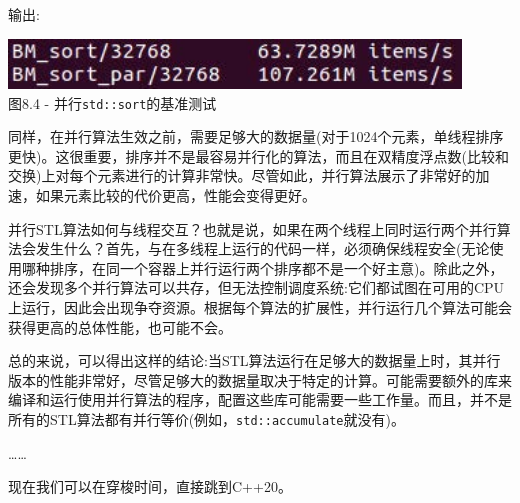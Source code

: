 输出:

\begin{center}
\includegraphics[width=0.9\textwidth]{content/2/chapter8/images/4.jpg}\\
图8.4 - 并行\texttt{std::sort}的基准测试
\end{center}

同样，在并行算法生效之前，需要足够大的数据量(对于1024个元素，单线程排序更快)。这很重要，排序并不是最容易并行化的算法，而且在双精度浮点数(比较和交换)上对每个元素进行的计算非常快。尽管如此，并行算法展示了非常好的加速，如果元素比较的代价更高，性能会变得更好。 

并行STL算法如何与线程交互？也就是说，如果在两个线程上同时运行两个并行算法会发生什么？首先，与在多线程上运行的代码一样，必须确保线程安全(无论使用哪种排序，在同一个容器上并行运行两个排序都不是一个好主意)。除此之外，还会发现多个并行算法可以共存，但无法控制调度系统:它们都试图在可用的CPU上运行，因此会出现争夺资源。根据每个算法的扩展性，并行运行几个算法可能会获得更高的总体性能，也可能不会。

总的来说，可以得出这样的结论:当STL算法运行在足够大的数据量上时，其并行版本的性能非常好，尽管足够大的数据量取决于特定的计算。可能需要额外的库来编译和运行使用并行算法的程序，配置这些库可能需要一些工作量。而且，并不是所有的STL算法都有并行等价(例如，\texttt{std::accumulate}就没有)。

……

现在我们可以在穿梭时间，直接跳到C++20。














